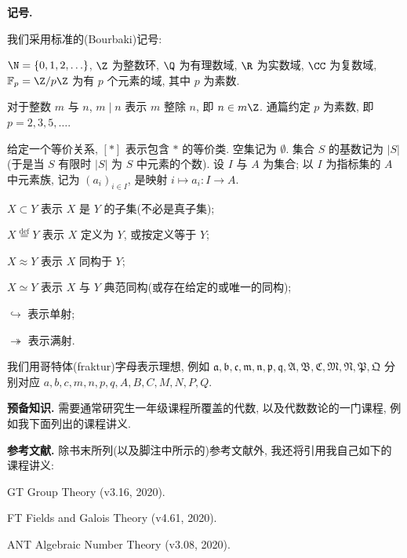 
\begingroup
{}
\clearpage
\noindent\textbf{记号.}

我们采用标准的(Bourbaki)记号:

$\N = \{0, 1, 2, \ldots\}$,
$\Z$ 为整数环,
$\Q$ 为有理数域,
$\R$ 为实数域,
$\CC$ 为复数域,
$\mathbb{F}_{p} = \Z/p\Z$ 为有 $p$ 个元素的域, 其中 $p$ 为素数.

对于整数 $m$ 与 $n$, $m\mid n$ 表示 $m$ 整除 $n$, 即 $n \in m\Z$. 通篇约定 $p$ 为素数, 即 $p = 2, 3, 5, \ldots$.

给定一个等价关系, $[*]$ 表示包含 $*$ 的等价类. 空集记为 $\emptyset$. 集合 $S$ 的基数记为 $|S|$ (于是当 $S$ 有限时 $|S|$ 为 $S$ 中元素的个数). 设 $I$ 与 $A$ 为集合; 以 $I$ 为指标集的 $A$ 中元素族, 记为 $(a_{i})_{i \in I}$, 是映射 $i \mapsto a_{i} : I \to A$.

$X \subset Y$ 表示 $X$ 是 $Y$ 的子集(不必是真子集);

$X \overset{\mathrm{def}}{=} Y$ 表示 $X$ 定义为 $Y$, 或按定义等于 $Y$;

$X \approx Y$ 表示 $X$ 同构于 $Y$;

$X \simeq Y$ 表示 $X$ 与 $Y$ 典范同构(或存在给定的或唯一的同构);

$\hookrightarrow$ 表示单射;

$\twoheadrightarrow$ 表示满射.

我们用哥特体(fraktur)字母表示理想, 例如
$\mathfrak{a}, \mathfrak{b}, \mathfrak{c}, \mathfrak{m}, \mathfrak{n}, \mathfrak{p}, \mathfrak{q},
 \mathfrak{A}, \mathfrak{B}, \mathfrak{C}, \mathfrak{M}, \mathfrak{N}, \mathfrak{P}, \mathfrak{Q}$
分别对应
$a, b, c, m, n, p, q, A, B, C, M, N, P, Q$.

\par\medskip\noindent\textbf{预备知识.}\enspace
需要通常研究生一年级课程所覆盖的代数, 以及代数数论的一门课程, 例如我下面列出的课程讲义.

\par\medskip\noindent\textbf{参考文献.}\enspace
除书末所列(以及脚注中所示的)参考文献外, 我还将引用我自己如下的课程讲义:

GT Group Theory (v3.16, 2020).

FT Fields and Galois Theory (v4.61, 2020).

ANT Algebraic Number Theory (v3.08, 2020).

